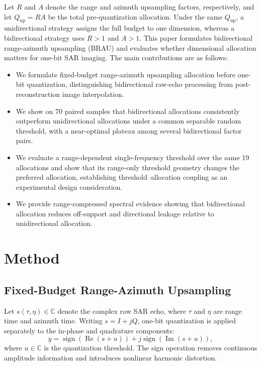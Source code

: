 \documentclass[conference]{IEEEtran}
\begin{document}
Let $R$ and $A$ denote the range and azimuth upsampling factors, respectively, and let $Q_{\mathrm{up}}=R A$ be the total pre-quantization allocation. Under the same $Q_{\mathrm{up}}$, a unidirectional strategy assigns the full budget to one dimension, whereas a bidirectional strategy uses $R>1$ and $A>1$. This paper formulates bidirectional range-azimuth upsampling (BRAU) and evaluates whether dimensional allocation matters for one-bit SAR imaging. The main contributions are as follows:
\begin{itemize}
    \item We formulate fixed-budget range-azimuth upsampling allocation before one-bit quantization, distinguishing bidirectional raw-echo processing from post-reconstruction image interpolation.
    \item We show on 70 paired samples that bidirectional allocations consistently outperform unidirectional allocations under a common separable random threshold, with a near-optimal plateau among several bidirectional factor pairs.
    \item We evaluate a range-dependent single-frequency threshold over the same 19 allocations and show that its range-only threshold geometry changes the preferred allocation, establishing threshold--allocation coupling as an experimental design consideration.
    \item We provide range-compressed spectral evidence showing that bidirectional allocation reduces off-support and directional leakage relative to unidirectional allocation.
\end{itemize}

\section{Method}

\subsection{Fixed-Budget Range-Azimuth Upsampling}

Let $s(\tau,\eta)\in\mathbb{C}$ denote the complex raw SAR echo, where $\tau$ and $\eta$ are range time and azimuth time. Writing $s=I+jQ$, one-bit quantization is applied separately to the in-phase and quadrature components:
\begin{equation}
    y=\operatorname{sign}\!\left(\operatorname{Re}(s+u)\right)
    +j\operatorname{sign}\!\left(\operatorname{Im}(s+u)\right),
\end{equation}
where $u\in\mathbb{C}$ is the quantization threshold. The sign operation removes continuous amplitude information and introduces nonlinear harmonic distortion.
\end{document}
